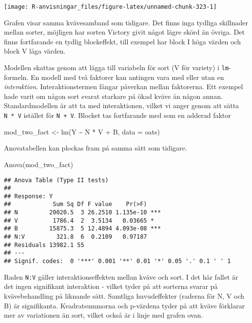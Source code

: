 \documentclass[
]{book}
\newenvironment{Shaded}{\begin{snugshade}}{\end{snugshade}}
\newcommand{\AttributeTok}[1]{\textcolor[rgb]{0.77,0.63,0.00}{#1}}
\newcommand{\FunctionTok}[1]{\textcolor[rgb]{0.00,0.00,0.00}{#1}}
\newcommand{\NormalTok}[1]{#1}
\newcommand{\OtherTok}[1]{\textcolor[rgb]{0.56,0.35,0.01}{#1}}
\newcommand{\SpecialCharTok}[1]{\textcolor[rgb]{0.00,0.00,0.00}{#1}}
\theoremstyle{definition}
\theoremstyle{definition}
\theoremstyle{definition}
\theoremstyle{definition}
\theoremstyle{remark}
\begin{document}
\begin{center}\texttt{[image: R-anvisningar\_files/figure-latex/unnamed-chunk-323-1]} \end{center}

Grafen visar samma kvävesamband som tidigare. Det finns inga tydliga skillnader mellan sorter, möjligen har sorten Victory givit något lägre skörd än övriga. Det finns fortfarande en tydlig blockeffekt, till exempel har block I höga värden och block V låga värden.

Modellen skattas genom att lägga till variabeln för sort (V för variety) i \texttt{lm}-formeln. En modell med två faktorer kan antingen vara med eller utan en \emph{interaktion}. Interaktionstermen fångar påverkan mellan faktorerna. Ett exempel hade varit om någon sort svarat starkare på ökad kväve än någon annan. Standardmodellen är att ta med interaktionen, vilket vi anger genom att sätta \texttt{N\ *\ V} istället för \texttt{N\ +\ V}. Blocket tas fortfarande med som en adderad faktor

\begin{Shaded}
\begin{Highlighting}[]
\NormalTok{mod\_two\_fact }\OtherTok{\textless{}{-}} \FunctionTok{lm}\NormalTok{(Y }\SpecialCharTok{\textasciitilde{}}\NormalTok{ N }\SpecialCharTok{*}\NormalTok{ V }\SpecialCharTok{+}\NormalTok{ B, }\AttributeTok{data =}\NormalTok{ oats)}
\end{Highlighting}
\end{Shaded}

Anovatabellen kan plockas fram på samma sätt som tidigare.

\begin{Shaded}
\begin{Highlighting}[]
\FunctionTok{Anova}\NormalTok{(mod\_two\_fact)}
\end{Highlighting}
\end{Shaded}

\begin{verbatim}
## Anova Table (Type II tests)
## 
## Response: Y
##            Sum Sq Df F value    Pr(>F)    
## N         20020.5  3 26.2510 1.135e-10 ***
## V          1786.4  2  3.5134   0.03665 *  
## B         15875.3  5 12.4894 4.093e-08 ***
## N:V         321.8  6  0.2109   0.97187    
## Residuals 13982.1 55                      
## ---
## Signif. codes:  0 '***' 0.001 '**' 0.01 '*' 0.05 '.' 0.1 ' ' 1
\end{verbatim}

Raden \texttt{N:V} gäller interaktionseffekten mellan kväve och sort. I det här fallet är det ingen signifikant interaktion - vilket tyder på att sorterna svarar på kvävebehandling på liknande sätt. Samtliga huvudeffekter (raderna för N, V och B) är signifikanta. Kvadratsummorna och p-värdena tyder på att kväve förklarar mer av variationen än sort, vilket också är i linje med grafen ovan.
\end{document}
